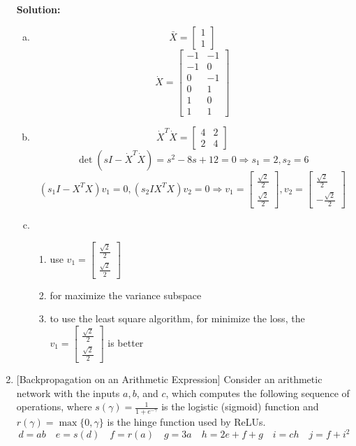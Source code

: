 \documentclass[10pt]{article}
\begin{document}
\begin{enumerate}[1.]
\textbf{Solution:}
\begin{enumerate}[(a)]
  \item 
  $$\bar X=\begin{bmatrix}
    1\\1
  \end{bmatrix}$$
  $$\dot X=\begin{bmatrix}
    -1&-1\\-1&0\\0&-1\\0&1\\1&0\\1&1
  \end{bmatrix}$$
  \item 
  $$\dot X^T\dot X=\begin{bmatrix}
    4&2\\2&4
  \end{bmatrix}$$
  $$\det(sI-\dot X^T\dot X)=s^2-8s+12=0\Rightarrow s_1=2,s_2=6$$
  $$(s_1I-X^TX)v_1=0,(s_2IX^TX)v_2=0\Rightarrow v_1=\begin{bmatrix}
    \frac{\sqrt2}{2}\\\frac{\sqrt2}{2}
  \end{bmatrix},v_2=\begin{bmatrix}
    \frac{\sqrt2}{2}\\-\frac{\sqrt2}{2}
  \end{bmatrix}$$
  \item 
  \begin{enumerate}
    \item use $v_1=\begin{bmatrix}
      \frac{\sqrt2}{2}\\\frac{\sqrt2}{2}
    \end{bmatrix}$
    \item for maximize the variance subspace
    \item to use the least square algorithm, for minimize the loss, the $v_1=\begin{bmatrix}
      \frac{\sqrt2}{2}\\\frac{\sqrt2}{2}
    \end{bmatrix}$ is better
  \end{enumerate}
\end{enumerate}
\newpage
 
	\item {} [Backpropagation on an Arithmetic Expression]
Consider an arithmetic network with the inputs $a, b$, and $c$, which computes the following sequence of operations, where $s(\gamma)=\frac{1}{1+e^{-\gamma}}$ is the logistic (sigmoid) function and $r(\gamma)=\max \{0, \gamma\}$ is the hinge function used by ReLUs.
$$
d=a b \quad e=s(d) \quad f=r(a) \quad g=3 a \quad h=2 e+f+g \quad i=c h \quad j=f+i^2
$$


\end{enumerate}
\end{document}
